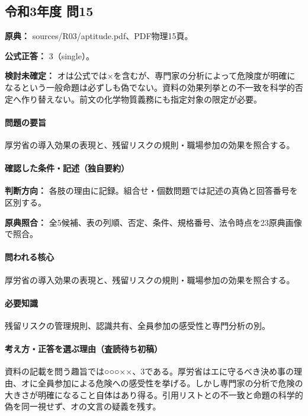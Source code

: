 \subsection{令和3年度 問15}
\label{q:r03-reg-apt-15}

\noindent\textbf{原典：} sources/R03/aptitude.pdf、PDF物理15頁。

\textbf{公式正答：} 3（single）。

\par\textbf{検討未確定：} オは公式では×を含むが、専門家の分析によって危険度が明確になるという一般命題は必ずしも偽でない。資料の効果列挙との不一致を科学的否定へ作り替えない。前文の化学物質義務にも指定対象の限定が必要。

\paragraph{問題の要旨} 厚労省の導入効果の表現と、残留リスクの規則・職場参加の効果を照合する。

\paragraph{確認した条件・記述（独自要約）}\mbox{}\par

\noindent\textbf{判断方向：} 各肢の理由に記録。組合せ・個数問題では記述の真偽と回答番号を区別する。\par

\noindent\textbf{原典照合：} 全5候補、表の列順、否定、条件、規格番号、法令時点を23原典画像で照合。\par

\paragraph{問われる核心} 厚労省の導入効果の表現と、残留リスクの規則・職場参加の効果を照合する。

\paragraph{必要知識} 残留リスクの管理規則、認識共有、全員参加の感受性と専門分析の別。

\paragraph{考え方・正答を選ぶ理由（査読待ち初稿）} 資料の記載を問う趣旨では○○○××、3である。厚労省はエに守るべき決め事の理由、オに全員参加による危険への感受性を挙げる。しかし専門家の分析で危険の大きさが明確になること自体はあり得る。引用リストとの不一致と命題の科学的偽を同一視せず、オの文言の疑義を残す。

